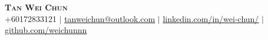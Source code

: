 \begin{center}
    \textbf{\Huge \scshape Tan Wei Chun} \\ \vspace{5pt}
    \small +60172833121 $|$ 
    \href{mailto:tanweichun@outlook.com}{\underline{tanweichun@outlook.com}} $|$ 
    \href{https://www.linkedin.com/in/wei-chun/}{\underline{linkedin.com/in/wei-chun/}} $|$
    \href{https://github.com/weichunnn}{\underline{github.com/weichunnn}}
\end{center}